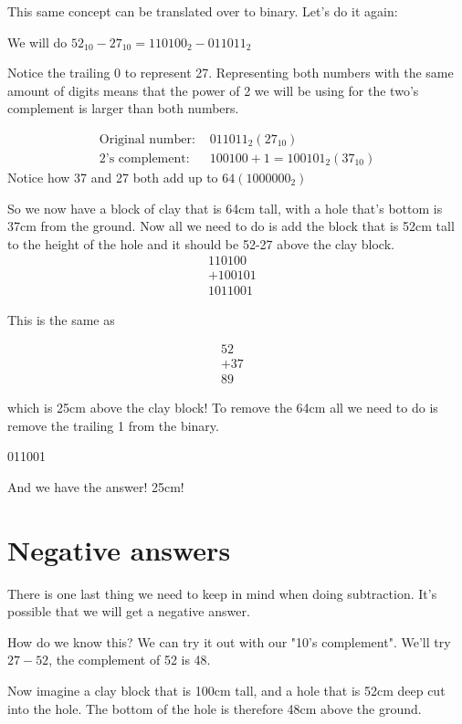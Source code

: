 \documentclass{article}
\begin{document}
  This same concept can be translated over to binary. Let's do it again:

  We will do $ 52_{10} - 27_{10} = 110100_{2} - 011011_{2}$

  Notice the trailing 0 to represent 27. Representing both numbers with the same amount of digits means that the
  power of 2 we will be using for the two's complement is larger than both numbers.

  \begin{align*}
    \text{Original number: } &011011_{2} (27_{10}) \\
    \text{2's complement: } &100100 + 1 = 100101_{2} (37_{10})
  \end{align*}
  Notice how 37 and 27 both add up to $64 (1000000_{2})$

  So we now have a block of clay that is 64cm tall, with a hole that's bottom is 37cm from the ground. Now all
  we need to do is add the block that is 52cm tall to the height of the hole and it should be 52-27 above the clay block.
  \begin{align*}
    110100& \\
 +  100101& \\
    1011001&
  \end{align*}
  
  This is the same as
  
  \begin{align*}
    52& \\
  + 37& \\
    89&
  \end{align*}

  which is 25cm above the clay block! To remove the 64cm all we need to do is remove the trailing 1 from the binary.

  011001

  And we have the answer! 25cm!

  \section{Negative answers}

  There is one last thing we need to keep in mind when doing subtraction. It's possible that we will get a negative answer.

  How do we know this? We can try it out with our "10's complement". We'll try $27 - 52$, the complement of 52 is 48.

  Now imagine a clay block that is 100cm tall, and a hole that is 52cm deep cut into the hole. The bottom of the hole is therefore 48cm
  above the ground.
\end{document}
